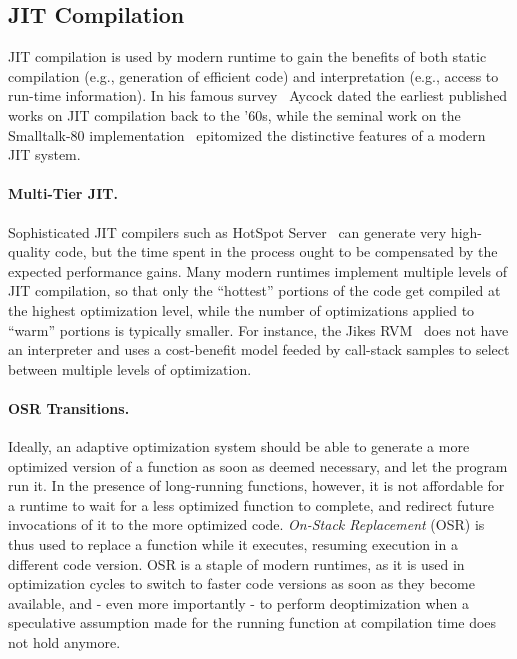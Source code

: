 \subsection*{JIT Compilation}

JIT compilation is used by modern runtime to gain the benefits of both static compilation (e.g., generation of efficient code) and interpretation (e.g., access to run-time information). In his famous survey~\cite{Aycock03} Aycock dated the earliest published works on JIT compilation back to the '60s, while the seminal work on the Smalltalk-80 implementation~\cite{Deutsch84} epitomized the distinctive features of a modern JIT system.

\paragraph*{Multi-Tier JIT.} Sophisticated JIT compilers such as HotSpot Server~\cite{Paleczny01} can generate very high-quality code, but the time spent in the process ought to be compensated by the expected performance gains. Many modern runtimes implement multiple levels of JIT compilation, so that only the ``hottest'' portions of the code get compiled at the highest optimization level, while the number of optimizations applied to ``warm'' portions is typically smaller. For instance, the Jikes RVM~\cite{Alpern00} does not have an interpreter and uses a cost-benefit model feeded by call-stack samples to select between multiple levels of optimization.

\paragraph*{OSR Transitions.} Ideally, an adaptive optimization system should be able to generate a more optimized version of a function as soon as deemed necessary, and let the program run it. In the presence of long-running functions, however, it is not affordable for a runtime to wait for a less optimized function to complete, and redirect future invocations of it to the more optimized code. {\em On-Stack Replacement} (OSR) is thus used to replace a function while it executes, resuming execution in a different code version. OSR is a staple of modern runtimes, as it is used in optimization cycles to switch to faster code versions as soon as they become available, and - even more importantly - to perform deoptimization when a speculative assumption made for the running function at compilation time does not hold anymore.


